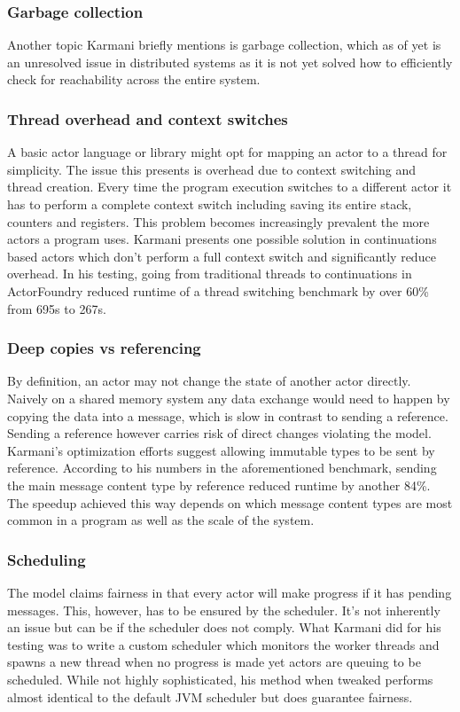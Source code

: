 \documentclass[A4]{article}
\begin{document}
\subsubsection{Garbage collection}
Another topic Karmani briefly mentions is garbage collection, which as of yet is an unresolved issue in distributed systems as it is not yet solved how to efficiently check for reachability across the entire system. \cite[p.~8]{reference/parallel/KarmaniA11}
\subsubsection{Thread overhead and context switches}
A basic actor language or library might opt for mapping an actor to a thread for simplicity. The issue this presents is overhead due to context switching and thread creation. Every time the program execution switches to a different actor it has to perform a complete context switch including saving its entire stack, counters and registers. This problem becomes increasingly prevalent the more actors a program uses. Karmani presents one possible solution in continuations based actors which don't perform a full context switch and significantly reduce overhead. In his testing, going from traditional threads to continuations in ActorFoundry reduced runtime of a thread switching benchmark by over 60\% from 695s to 267s. \cite[p.~8]{conf/pppj/KarmaniSA09}
\subsubsection{Deep copies vs referencing}
By definition, an actor may not change the state of another actor directly. Naively on a shared memory system any data exchange would need to happen by copying the data into a message, which is slow in contrast to sending a reference. Sending a reference however carries risk of direct changes violating the model. Karmani's optimization efforts suggest allowing immutable types to be sent by reference. According to his numbers in the aforementioned benchmark, sending the main message content type by reference reduced runtime by another 84\%. \cite[p.~9]{conf/pppj/KarmaniSA09}
The speedup achieved this way depends on which message content types are most common in a program as well as the scale of the system.
\subsubsection{Scheduling}
The model claims fairness in that every actor will make progress if it has pending messages. This, however, has to be ensured by the scheduler. It's not inherently an issue but can be if the scheduler does not comply. What Karmani did for his testing was to write a custom scheduler which monitors the worker threads and spawns a new thread when no progress is made yet actors are queuing to be scheduled. While not highly sophisticated, his method when tweaked performs almost identical to the default JVM scheduler but does guarantee fairness. \cite[p.~9]{conf/pppj/KarmaniSA09}
\end{document}
